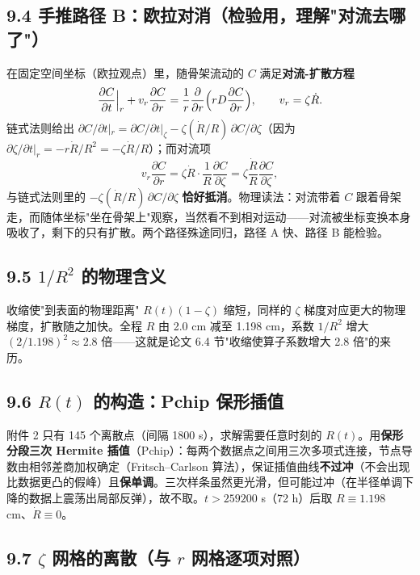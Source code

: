 \documentclass[12pt,a4paper]{ctexart}
\newcommand{\pdd}[2]{\dfrac{\partial #1}{\partial #2}}
\begin{document}
\subsection{9.4 手推路径 B：欧拉对消（检验用，理解"对流去哪了"）}

在固定空间坐标（欧拉观点）里，随骨架流动的 $C$ 满足\textbf{对流-扩散方程}
\begin{equation}
\pdd{C}{t}\Big|_r+v_r\pdd{C}{r}=\frac{1}{r}\pdd{}{r}\Bigl(rD\pdd{C}{r}\Bigr),
\qquad v_r=\zeta\dot R.
\end{equation}
链式法则给出 $\partial C/\partial t|_r=\partial C/\partial t|_\zeta-\zeta(\dot R/R)\,\partial C/\partial\zeta$（因为 $\partial\zeta/\partial t|_r=-r\dot R/R^2=-\zeta\dot R/R$）；而对流项
\begin{equation}
v_r\pdd{C}{r}=\zeta\dot R\cdot\frac{1}{R}\pdd{C}{\zeta}
=\zeta\frac{\dot R}{R}\pdd{C}{\zeta},
\end{equation}
与链式法则里的 $-\zeta(\dot R/R)\,\partial C/\partial\zeta$ \textbf{恰好抵消}。物理读法：对流带着 $C$ 跟着骨架走，而随体坐标"坐在骨架上"观察，当然看不到相对运动——对流被坐标变换本身吸收了，剩下的只有扩散。两个路径殊途同归，路径 A 快、路径 B 能检验。

\subsection{9.5 $1/R^2$ 的物理含义}

收缩使"到表面的物理距离" $R(t)(1-\zeta)$ 缩短，同样的 $\zeta$ 梯度对应更大的物理梯度，扩散随之加快。全程 $R$ 由 2.0 cm 减至 1.198 cm，系数 $1/R^2$ 增大 $(2/1.198)^2\approx2.8$ 倍——这就是论文 6.4 节"收缩使算子系数增大 2.8 倍"的来历。

\subsection{9.6 $R(t)$ 的构造：Pchip 保形插值}

附件 2 只有 145 个离散点（间隔 1800 s），求解需要任意时刻的 $R(t)$。用\textbf{保形分段三次 Hermite 插值}（Pchip）：每两个数据点之间用三次多项式连接，节点导数由相邻差商加权确定（Fritsch--Carlson 算法），保证插值曲线\textbf{不过冲}（不会出现比数据更凸的假峰）且\textbf{保单调}。三次样条虽然更光滑，但可能过冲（在半径单调下降的数据上震荡出局部反弹），故不取。$t>259200$ s（72 h）后取 $R\equiv1.198$ cm、$\dot R\equiv0$。

\subsection{9.7 $\zeta$ 网格的离散（与 $r$ 网格逐项对照）}
\end{document}
